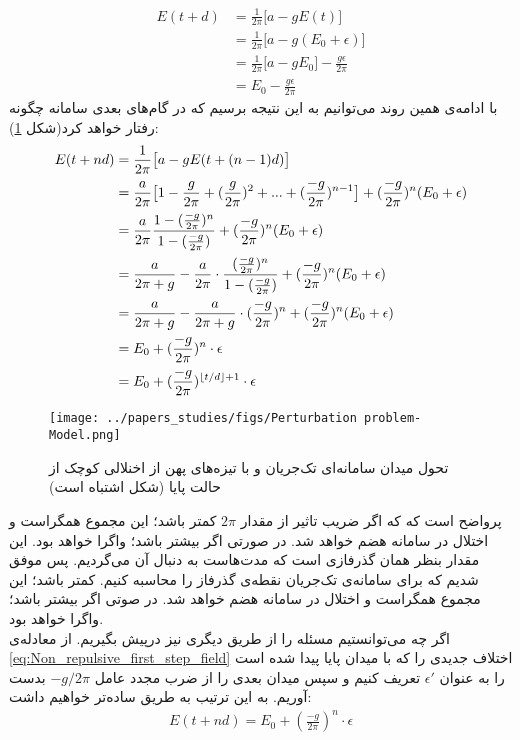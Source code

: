 \begin{align}
	E(t+d) &= \frac{1}{2\pi} \big[ a - g E(t) \big]\\
	&=  \frac{1}{2\pi} \big[ a - g (E_0 + \epsilon) \big]\\
	&=  \frac{1}{2\pi} \big[ a - g E_0 \big] - \frac{g\epsilon}{2\pi}\\
	&= E_0 - \frac{g\epsilon}{2\pi} \label{eq:Non_repulsive_first_step_field}
\end{align}
با ادامه‌ی همین روند می‌توانیم به این نتیجه برسیم که در گام‌های بعدی سامانه چگونه رفتار خواهد کرد(شکل \ref{fig:non_repulsive_single_input_perturbation}): 
\begin{align}
	E(t + nd) &= \frac{1}{2\pi} \big[ a - g E(t+(n-1)d) \big]\\
	&= \frac{a}{2\pi} \big[ 1 - \frac{g}{2\pi} + (\frac{g}{2\pi})^2 + ... + (\frac{-g}{2\pi})^{n - 1} \big] + (\frac{-g}{2\pi})^{n} (E_0 + \epsilon)
	\label{eq:geometric_sum}\\
	&= \frac{a}{2\pi} \frac{1 - (\frac{-g}{2\pi})^{n} }{ 1 - (\frac{-g}{2\pi})} + (\frac{-g}{2\pi})^{n} (E_0 + \epsilon)\\
	&= \frac{a}{2\pi + g} - \frac{a}{2\pi} \cdot \frac{ (\frac{-g}{2\pi})^{n} }{ 1 - (\frac{-g}{2\pi})} + (\frac{-g}{2\pi})^{n} (E_0 + \epsilon)\\
	&= \frac{a}{2\pi + g} - \frac{a}{2\pi + g} \cdot (\frac{-g}{2\pi})^{n} + (\frac{-g}{2\pi})^{n} (E_0 + \epsilon)\\
	&= E_0 + (\frac{-g}{2\pi})^n \cdot \epsilon\\
	&= E_0 + (\frac{-g}{2\pi})^{\left\lfloor t/d \right\rfloor + 1} \cdot \epsilon
\end{align}

\begin{figure}[h]
	\centering
	\texttt{[image: ../papers\_studies/figs/Perturbation problem-Model.png]}
	\caption{
		تحول میدان سامانه‌ای تک‌جریان و با تیزه‌های پهن از اخنلالی کوچک از حالت پایا (شکل اشتباه است)
	}
	\label{fig:non_repulsive_single_input_perturbation}
\end{figure}

پرواضح است که که اگر ضریب تاثیر از مقدار 
$2\pi$
کمتر باشد؛ این مجموع همگراست و اختلال در سامانه هضم خواهد شد. در صورتی اگر بیشتر باشد؛ واگرا خواهد بود. این مقدار بنظر همان گذرفازی است که مدت‌هاست به دنبال آن می‌گردیم. پس موفق شدیم که برای سامانه‌ی تک‌جریان نقطه‌ی گذرفاز را محاسبه کنیم. کمتر باشد؛ این مجموع همگراست و اختلال در سامانه‌ هضم خواهد شد. در صوتی اگر بیشتر باشد؛ واگرا خواهد بود.\\
اگر چه می‌توانستیم مسئله را از طریق دیگری نیز درپیش بگیریم. از معادله‌ی 
\ref{eq:Non_repulsive_first_step_field}
اختلاف جدیدی را که با میدان پایا پیدا شده است را به عنوان 
$\epsilon'$
تعریف کنیم و سپس میدان بعدی را از ضرب مجدد عامل
$ - g/2\pi$
بدست آوریم. به این ترتیب به طریق ساده‌تر خواهیم داشت:
\begin{align}
	E(t+nd) = E_0 + (\frac{-g}{2\pi})^n \cdot \epsilon
\end{align}

